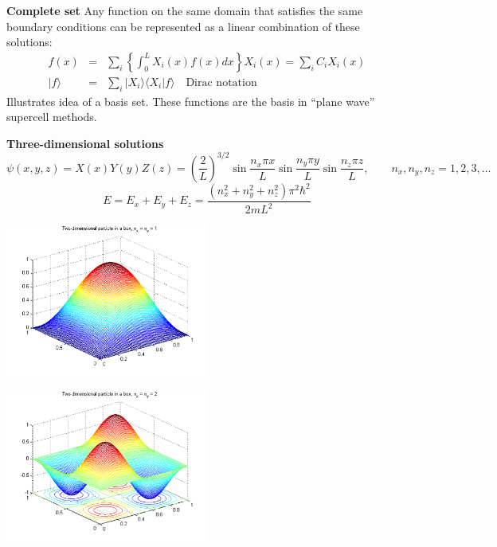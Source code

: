 \documentclass[11pt]{article}
\begin{document}
\textbf{Complete set}
Any function on the same domain that satisfies the same boundary conditions can be represented as a linear combination of these solutions:
\begin{eqnarray}
f(x) &=& \sum_i \left \{\int_0^L X_i(x) f(x) dx \right \}  X_i(x)  = \sum_i C_i X_i(x)\\
|f\rangle &= &\sum_i |X_i\rangle\langle X_i | f\rangle\quad\text{Dirac notation}
\end{eqnarray}
Illustrates idea of a basis set. These functions are the basis in ``plane wave'' supercell methods.

\textbf{Three-dimensional solutions}
\begin{equation}
\psi(x,y,z) = X(x)Y(y)Z(z) = \left ( \frac{2}{L} \right )^{3/2} \sin\frac{n_x\pi x}{L}\sin\frac{n_y\pi y}{L}\sin\frac{n_z\pi z}{L},\qquad n_{x},n_{y},n_{z}=1,2,3,\ldots
\end{equation}
\begin{equation}
\label{eq:2}
E = E_{x}+E_{y}+E_{z}=\frac{(n_{x}^{2}+n_{y}^{2}+n_{z}^{2}) \pi^{2}\hbar^{2}}{2 m L^{2}}
\end{equation}

\begin{center}
\includegraphics[width=0.5\textwidth]{./Images/2DSine1.png}
\end{center}
\begin{center}
\includegraphics[width=0.5\textwidth]{./Images/2DSine2.png}
\end{center}
\end{document}

